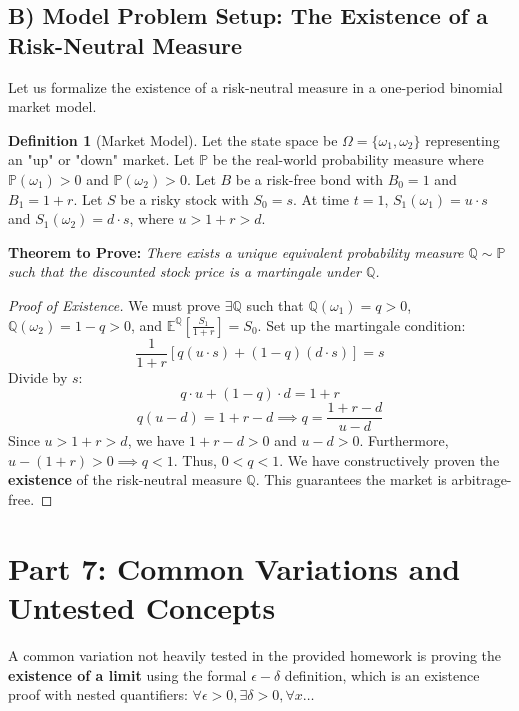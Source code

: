 \documentclass[11pt, a4paper]{article}
\theoremstyle{definition}
\newtheorem{definition}{Definition}[section]
\theoremstyle{remark}
\newcommand{\Q}{\mathbb{Q}}
\newcommand{\E}{\mathbb{E}}
\newcommand{\Prob}{\mathbb{P}}
\begin{document}
\subsection{B) Model Problem Setup: The Existence of a Risk-Neutral Measure}
Let us formalize the existence of a risk-neutral measure in a one-period binomial market model.
\begin{definition}[Market Model]
    Let the state space be $\Omega = \{\omega_1, \omega_2\}$ representing an "up" or "down" market. Let $\Prob$ be the real-world probability measure where $\Prob(\omega_1) > 0$ and $\Prob(\omega_2) > 0$.
    Let $B$ be a risk-free bond with $B_0 = 1$ and $B_1 = 1+r$.
    Let $S$ be a risky stock with $S_0 = s$. At time $t=1$, $S_1(\omega_1) = u \cdot s$ and $S_1(\omega_2) = d \cdot s$, where $u > 1+r > d$.
\end{definition}

\textbf{Theorem to Prove:} \textit{There exists a unique equivalent probability measure $\Q \sim \Prob$ such that the discounted stock price is a martingale under $\Q$.}

\begin{proof}[Proof of Existence]
    We must prove $\exists \Q$ such that $\Q(\omega_1) = q > 0$, $\Q(\omega_2) = 1-q > 0$, and $\E^\Q\left[\frac{S_1}{1+r}\right] = S_0$.
    Set up the martingale condition:
    \[ \frac{1}{1+r} [q(u \cdot s) + (1-q)(d \cdot s)] = s \]
    Divide by $s$:
    \[ q \cdot u + (1-q) \cdot d = 1+r \]
    \[ q(u-d) = 1+r-d \implies q = \frac{1+r-d}{u-d} \]
    Since $u > 1+r > d$, we have $1+r-d > 0$ and $u-d > 0$. Furthermore, $u - (1+r) > 0 \implies q < 1$.
    Thus, $0 < q < 1$. 
    We have constructively proven the \textbf{existence} of the risk-neutral measure $\Q$. This guarantees the market is arbitrage-free.
\end{proof}

\newpage

\section{Part 7: Common Variations and Untested Concepts}

A common variation not heavily tested in the provided homework is proving the \textbf{existence of a limit} using the formal $\epsilon-\delta$ definition, which is an existence proof with nested quantifiers: $\forall \epsilon > 0, \exists \delta > 0, \forall x \dots$
\end{document}
